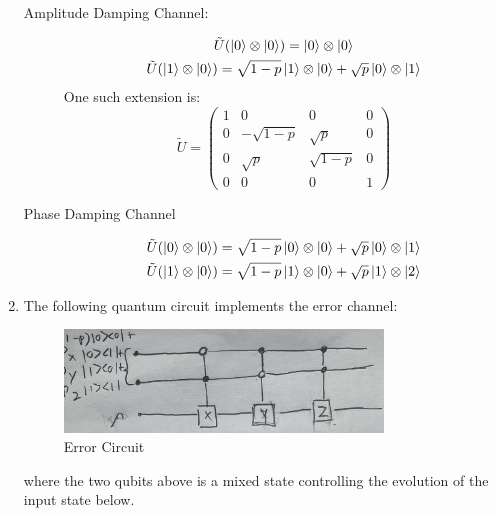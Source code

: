 \documentclass[12pt]{article}%
\begin{document}
\begin{enumerate}
		\begin{description}
			\item[Amplitude Damping Channel:] 
			\begin{gather*}
			\tilde{U}(\ket{0}\otimes \ket{0}) = \ket{0} \otimes \ket{0} \\
			\tilde{U}(\ket{1}\otimes \ket{0}) = \sqrt{1-p} \ket{1} \otimes \ket{0} + \sqrt{p} \ket{0} \otimes \ket{1} \\
			\end{gather*}
			One such extension is:
			\[
				\tilde{U} = \left( \begin{matrix}
						1 & 0 & 0 & 0 \\
						0 & - \sqrt{1 - p} & \sqrt{p} & 0 \\
						0 & \sqrt{p} & \sqrt{1 - p} & 0 \\
						0 & 0 & 0 & 1
				\end{matrix}\right)
		\]
			\item[Phase Damping Channel] 
			\begin{gather*}
				\tilde{U}(\ket{0} \otimes \ket{0}) = \sqrt{1 -p} \ket{0} \otimes \ket{0} + \sqrt{p} \ket{0} \otimes \ket{1} \\
				\tilde{U}(\ket{1} \otimes \ket{0}) =  \sqrt{1-p} \ket{1} \otimes \ket{0} + \sqrt{p}\ket{1} \otimes \ket{2}
			\end{gather*}
		\end{description}
	\item The following quantum circuit implements the error channel:
		\begin{figure}[h]
			\centering
			\includegraphics[width=0.8\textwidth]{fig}
			\caption{Error Circuit}
			\label{fig:}
		\end{figure}
where the two qubits above is a mixed state controlling the evolution of the input state below.
\end{enumerate}
\end{document}
